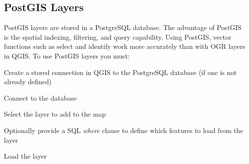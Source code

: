 \documentclass[10pt,english]{article}
\begin{document}
\begin{onehalfspace}
\subsection{PostGIS Layers}
PostGIS layers are stored in a PostgreSQL database. The advantage of PostGIS is the spatial indexing, filtering, and query capability. Using PostGIS, vector functions such as select and identify work more accurately than with OGR layers in QGIS.
To use PostGIS layers you must:
\begin{compactenum}
\item Create a stored connection in QGIS to the PostgreSQL database (if one is
not already defined)
\item Connect to the database
\item Select the layer to add to the map
\item Optionally provide a SQL \textit{where} clause to define which features to load from the layer
\item Load the layer
\end{compactenum}

\end{onehalfspace}
\end{document}
